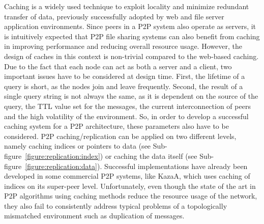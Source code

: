 Caching is a widely used technique to exploit locality and minimize redundant
transfer of data, previously successfully adopted by web and file server
application environments. Since peers in a P2P system also operate as servers,
it is intuitively expected that P2P file sharing systems can also benefit from
caching in improving performance and reducing overall resource usage. However,
the design of caches in this context is non-trivial compared to the web-based
caching. Due to the fact that each node can act as both a server and a client,
two important issues have to be considered at design time. First, the lifetime
of a query is short, as the nodes join and leave frequently. Second, the result
of a single query string is not always the same, as it is dependent on the
source of the query, the TTL value set for the messages, the current
interconnection of peers and the high volatility of the environment. So, in
order to develop a successful caching system for a P2P architecture, these
parameters also have to be considered. P2P caching/replication can be applied
on two different levels, namely caching indices or pointers to data (see
Sub-figure~\ref{figure:replication:index}) or caching the data itself (see
Sub-figure~\ref{figure:replication:data}). Successful implementations have
already been developed in some commercial P2P systems, like KazaA, which uses
caching of indices on its super-peer level. Unfortunately, even though the
state of the art in P2P algorithms using caching methods reduce the resource
usage of the network, they also fail to consistently address typical problems
of a topologically mismatched environment such as duplication of messages.

%

